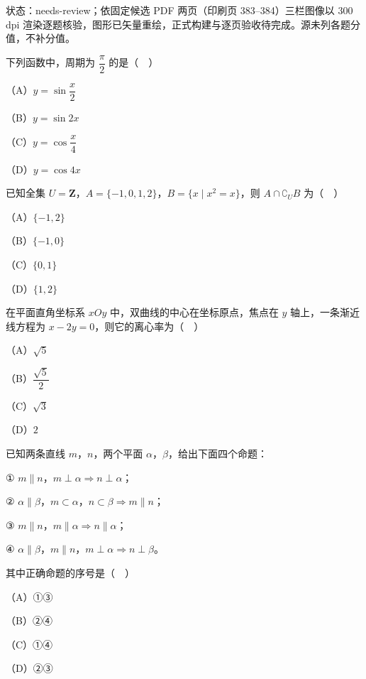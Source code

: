 

状态：needs-review；依固定候选 PDF 两页（印刷页 383–384）三栏图像以 300 dpi 渲染逐题核验，图形已矢量重绘，正式构建与逐页验收待完成。源未列各题分值，不补分值。


\begin{question}
下列函数中，周期为 $\dfrac{\pi}{2}$ 的是（　）

（A）$y=\sin\dfrac{x}{2}$

（B）$y=\sin2x$

（C）$y=\cos\dfrac{x}{4}$

（D）$y=\cos4x$

\end{question}
\begin{question}
已知全集 $U=\mathbf Z$，$A=\{-1,0,1,2\}$，$B=\{x\mid x^2=x\}$，则 $A\cap\complement_UB$ 为（　）

（A）$\{-1,2\}$

（B）$\{-1,0\}$

（C）$\{0,1\}$

（D）$\{1,2\}$

\end{question}
\begin{question}
在平面直角坐标系 $xOy$ 中，双曲线的中心在坐标原点，焦点在 $y$ 轴上，一条渐近线方程为 $x-2y=0$，则它的离心率为（　）

（A）$\sqrt5$

（B）$\dfrac{\sqrt5}{2}$

（C）$\sqrt3$

（D）$2$

\end{question}
\begin{question}
已知两条直线 $m$，$n$，两个平面 $\alpha$，$\beta$，给出下面四个命题：

① $m\parallel n$，$m\perp\alpha\Rightarrow n\perp\alpha$；

② $\alpha\parallel\beta$，$m\subset\alpha$，$n\subset\beta\Rightarrow m\parallel n$；

③ $m\parallel n$，$m\parallel\alpha\Rightarrow n\parallel\alpha$；

④ $\alpha\parallel\beta$，$m\parallel n$，$m\perp\alpha\Rightarrow n\perp\beta$。

其中正确命题的序号是（　）

（A）①③

（B）②④

（C）①④

（D）②③

\end{question}
